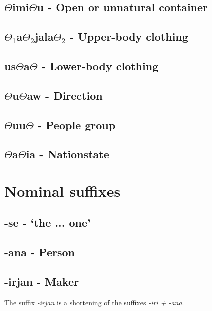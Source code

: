 \documentclass[a4paper,10pt,twoside,openright]{memoir}
\newcommand{\rootpart}{$\Theta$}
\begin{document}
\subsection{\rootpart{}imi\rootpart{}u - Open or unnatural container}

\subsection{{\rootpart$_1$}a{\rootpart$_2$}jala{\rootpart$_2$} - Upper-body clothing}

\subsection{us\rootpart{}a\rootpart{} - Lower-body clothing}

\subsection{\rootpart{}u\rootpart{}aw - Direction}

\subsection{\rootpart{}uu\rootpart{} - People group}

\subsection{\rootpart{}a\rootpart{}ia - Nationstate}

\section{Nominal suffixes}


\subsection{-se - `the ... one'}

\subsection{-ana - Person}

\subsection{-irjan - Maker}

The suffix \textit{-irjan} is a shortening of the suffixes \textit{-iri + -ana}. 
\end{document}
